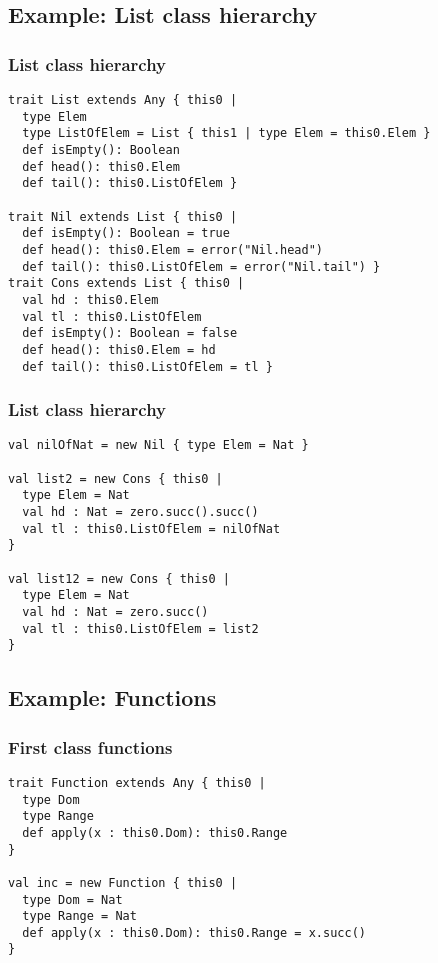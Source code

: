 \documentclass[aspectratio=169]{beamer}
\begin{document}
\subsection{Example: List class hierarchy}

\begin{frame}[fragile]
\frametitle{List class hierarchy}
\pause
\begin{lstlisting}
trait List extends Any { this0 |
  type Elem
  type ListOfElem = List { this1 | type Elem = this0.Elem }
  def isEmpty(): Boolean
  def head(): this0.Elem
  def tail(): this0.ListOfElem }

trait Nil extends List { this0 |
  def isEmpty(): Boolean = true
  def head(): this0.Elem = error("Nil.head")
  def tail(): this0.ListOfElem = error("Nil.tail") }
trait Cons extends List { this0 |
  val hd : this0.Elem
  val tl : this0.ListOfElem
  def isEmpty(): Boolean = false
  def head(): this0.Elem = hd
  def tail(): this0.ListOfElem = tl }
\end{lstlisting}
\end{frame}

\begin{frame}[fragile]
\frametitle{List class hierarchy}
\begin{lstlisting}
val nilOfNat = new Nil { type Elem = Nat }

val list2 = new Cons { this0 |
  type Elem = Nat
  val hd : Nat = zero.succ().succ()
  val tl : this0.ListOfElem = nilOfNat
}

val list12 = new Cons { this0 |
  type Elem = Nat
  val hd : Nat = zero.succ()
  val tl : this0.ListOfElem = list2
}
\end{lstlisting}
\end{frame}

\subsection{Example: Functions}

\begin{frame}[fragile]
\frametitle{First class functions}
\pause
\begin{lstlisting}
trait Function extends Any { this0 |
  type Dom
  type Range
  def apply(x : this0.Dom): this0.Range
}

val inc = new Function { this0 |
  type Dom = Nat
  type Range = Nat
  def apply(x : this0.Dom): this0.Range = x.succ()
}
\end{lstlisting}
\end{frame}
\end{document}
